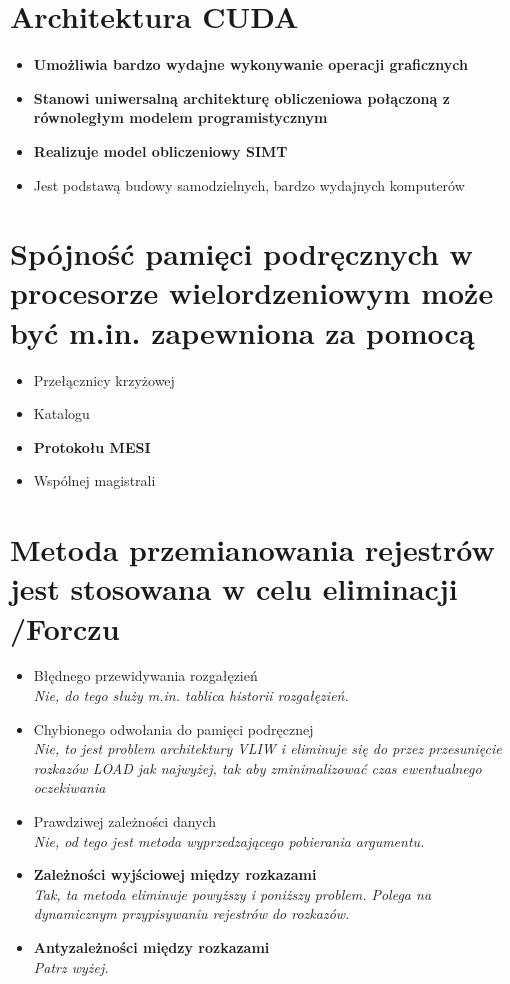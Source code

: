 \documentclass[a4paper,twoside]{article}
\begin{document}
\section{Architektura CUDA}
	\begin{itemize}
    \item \textbf{Umożliwia bardzo wydajne wykonywanie operacji graficznych}
    \item \textbf{Stanowi uniwersalną architekturę obliczeniowa połączoną z równoległym modelem programistycznym}
    \item \textbf{Realizuje model obliczeniowy SIMT}
    \item Jest podstawą budowy samodzielnych, bardzo wydajnych komputerów
    \end{itemize}

\section{Spójność pamięci podręcznych w procesorze wielordzeniowym może być m.in. zapewniona za pomocą}
	\begin{itemize}
    \item Przełącznicy krzyżowej
    \item Katalogu
    \item \textbf{Protokołu MESI}
    \item Wspólnej magistrali
    \end{itemize}

\section{Metoda przemianowania rejestrów jest stosowana w celu eliminacji {\small /Forczu}}
	\begin{itemize}
    \item Błędnego przewidywania rozgałęzień\\
    {\small \emph{Nie, do tego służy m.in. tablica historii rozgałęzień.}}
    \item Chybionego odwołania do pamięci podręcznej\\
    {\small \emph{Nie, to jest problem architektury VLIW i eliminuje się do przez przesunięcie rozkazów LOAD jak najwyżej, tak aby zminimalizować czas ewentualnego oczekiwania}}
    \item Prawdziwej zależności danych\\
    {\small \emph{Nie, od tego jest metoda wyprzedzającego pobierania argumentu.}}
    \item \textbf{Zależności wyjściowej między rozkazami}\\
    {\small \emph{Tak, ta metoda eliminuje powyższy i poniższy problem. Polega na dynamicznym przypisywaniu rejestrów do rozkazów.}}
    \item \textbf{Antyzależności między rozkazami}\\
    {\small \emph{Patrz wyżej.}}
    
    \end{itemize}
\end{document}
